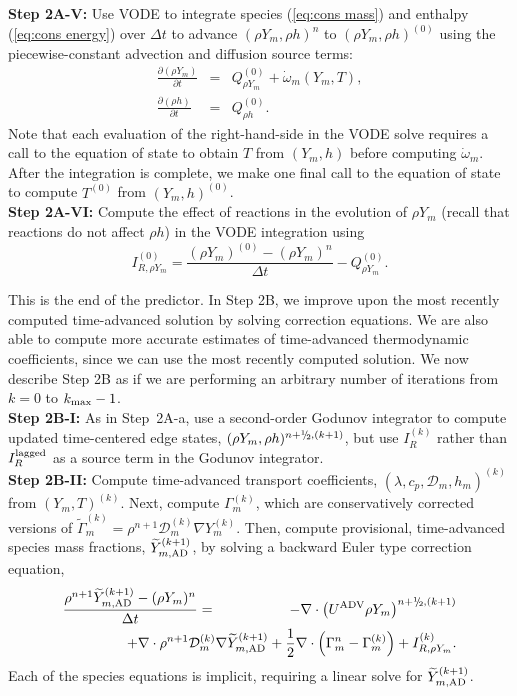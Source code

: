 {\bf Step 2A-V:} Use VODE to integrate species (\ref{eq:cons mass}) and enthalpy (\ref{eq:cons energy}) over $\Delta t$
to advance $(\rho Y_m,\rho h)^n$ to $(\rho Y_m,\rho h)^{(0)}$ using the piecewise-constant
advection and diffusion source terms:
\begin{eqnarray}
\frac{\partial(\rho Y_m)}{\partial t} &=& Q_{\rho Y_m}^{(0)} + \dot\omega_m(Y_m,T),\label{eq:MISDC VODE 1}\\
\frac{\partial(\rho h)}{\partial t} &=& Q_{\rho h}^{(0)}.\label{eq:MISDC VODE 2}
\end{eqnarray}
Note that each evaluation of the right-hand-side in the VODE solve requires a call to the equation 
of state to obtain $T$ from $(Y_m,h)$ before computing $\dot\omega_m$.  After the 
integration is complete, we make one final call to the equation of state
to compute $T^{(0)}$ from $(Y_m,h)^{(0)}$.\\

{\bf Step 2A-VI:} Compute the effect of reactions in the evolution of $\rho Y_m$ (recall that reactions do not
affect $\rho h$) in the VODE integration using
\begin{equation}
I_{R,\rho Y_m}^{(0)} = \frac{(\rho Y_m)^{(0)} - (\rho Y_m)^n}{\Delta t} - Q_{\rho Y_m}^{(0)}.
\end{equation}

This is the end of the predictor.  In Step 2B, we improve upon the most recently computed
time-advanced solution by solving correction equations.  We are also able to compute more accurate
estimates of time-advanced thermodynamic coefficients, since we can use the most recently computed
solution.  We now describe Step 2B as if we are performing an arbitrary number of iterations 
from $k=0$ to $k_{\rm max}-1$.\\

{\bf Step 2B-I:} 
As in Step~2A-a, use a second-order Godunov integrator to compute updated time-centered edge states, 
$(\rho Y_m,\rho h)^{n+\myhalf,(k+1)}$, but use $I_R^{(k)}$ rather than
$I_R^{\rm lagged}$ as a source term in the Godunov integrator.\\

{\bf Step 2B-II:} Compute time-advanced transport coefficients, $(\lambda,c_p,\mathcal D_m,h_m)^{(k)}$ from $(Y_m,T)^{(k)}$.
Next, compute $\Gamma_m^{(k)}$, which are conservatively corrected versions of 
$\widetilde\Gamma_m^{(k)} = \rho^{n+1}\mathcal D_m^{(k)}\nabla Y_m^{(k)}$.
Then, compute provisional, time-advanced species mass fractions, $\widetilde Y_{m,{\rm AD}}^{(k+1)}$, by solving a backward Euler type
correction equation,
\begin{eqnarray}
\frac{\rho^{n+1}\widetilde Y_{m,{\rm AD}}^{(k+1)} - (\rho Y_m)^n}{\Delta t} &=& -\nabla\cdot\left(\uadv\rho Y_m\right)^{n+\myhalf,(k+1)}\nonumber\\
&&\hspace{-2.5cm}+ \nabla\cdot\rho^{n+1}\mathcal D_m^{(k)}\nabla\widetilde Y_{m,{\rm AD}}^{(k+1)}
+ \half\nabla\cdot\left(\Gamma_m^n - \Gamma_m^{(k)}\right)  + I_{R,\rho Y_m}^{(k)}.
\end{eqnarray}
Each of the species equations is implicit, requiring a linear solve for $\widetilde Y_{m,{\rm AD}}^{(k+1)}$.\\

